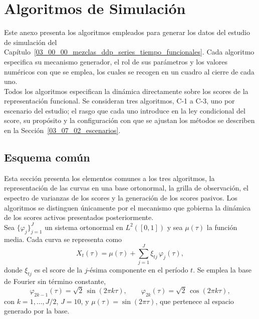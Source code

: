 \renewcommand{\appendixname}{Anexo}

\chapter{Algoritmos de Simulación}
\label{ane_00_00_anexo}
Este anexo presenta los algoritmos empleados para generar los datos del estudio de simulación del Capítulo~\ref{03_00_00_mezclas_ddp_series_tiempo_funcionales}. Cada algoritmo especifica su mecanismo generador, el rol de sus parámetros y los valores numéricos con que se emplea, los cuales se recogen en un cuadro al cierre de cada uno.\\

Todos los algoritmos especifican la dinámica directamente sobre los scores de la representación funcional. Se consideran tres algoritmos, C-1 a C-3, uno por escenario del estudio; el rasgo que cada uno introduce en la ley condicional del score, su propósito y la configuración con que se ajustan los métodos se describen en la Sección~\ref{03_07_02_escenarios}.

\section{Esquema común}
\label{ane_00_01_esquema_comun}

Esta sección presenta los elementos comunes a los tres algoritmos, la representación de las curvas en una base ortonormal, la grilla de observación, el espectro de varianzas de los scores y la generación de los scores pasivos. Los algoritmos se distinguen únicamente por el mecanismo que gobierna la dinámica de los scores activos presentados posteriormente.\\

Sea $\{\varphi_j\}_{j=1}^{J}$ un sistema ortonormal en $L^2([0,1])$ y sea $\mu(\tau)$ la función media. Cada curva se representa como
\begin{equation}
\label{eq:ane_coef_curva}
X_t(\tau)
=
\mu(\tau)
+
\sum_{j=1}^{J}
\xi_{tj}\,\varphi_j(\tau),
\end{equation}
donde $\xi_{tj}$ es el score de la $j$-ésima componente en el período $t$. Se emplea la base de Fourier sin término constante,
\begin{equation}
\label{eq:ane_fourier}
\varphi_{2k-1}(\tau)=\sqrt{2}\,\sin(2\pi k\tau),
\qquad
\varphi_{2k}(\tau)=\sqrt{2}\,\cos(2\pi k\tau),
\end{equation}
con $k=1,\ldots,J/2$, $J=10$, y $\mu(\tau)=\sin(2\pi\tau)$, que pertenece al espacio generado por la base.\\


